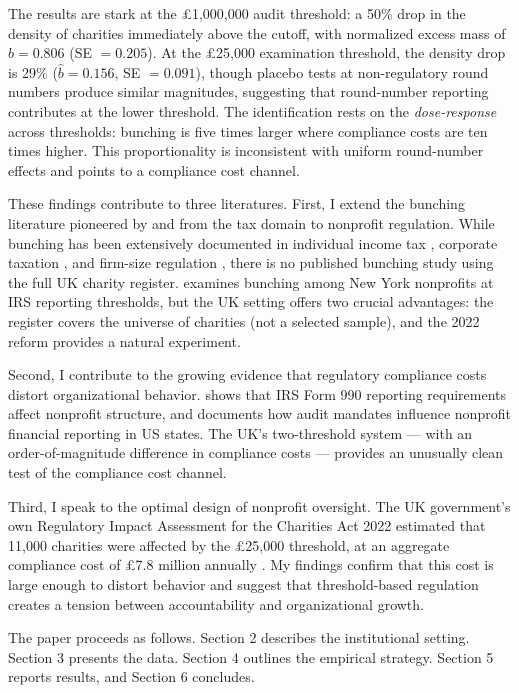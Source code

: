 \documentclass[12pt]{article}
\begin{document}
The results are stark at the \pounds1,000,000 audit threshold: a 50\% drop in the density of charities immediately above the cutoff, with normalized excess mass of $\hat{b} = 0.806$ (SE $= 0.205$). At the \pounds25,000 examination threshold, the density drop is 29\% ($\hat{b} = 0.156$, SE $= 0.091$), though placebo tests at non-regulatory round numbers produce similar magnitudes, suggesting that round-number reporting contributes at the lower threshold. The identification rests on the \emph{dose-response} across thresholds: bunching is five times larger where compliance costs are ten times higher. This proportionality is inconsistent with uniform round-number effects and points to a compliance cost channel.

These findings contribute to three literatures. First, I extend the bunching literature pioneered by \citet{saez2010} and \citet{klevenWaseem2013} from the tax domain to nonprofit regulation. While bunching has been extensively documented in individual income tax \citep{chetty2011adjustment}, corporate taxation \citep{deMontolivet2023}, and firm-size regulation \citep{garicano2016}, there is no published bunching study using the full UK charity register. \citet{yildirim2018} examines bunching among New York nonprofits at IRS reporting thresholds, but the UK setting offers two crucial advantages: the register covers the universe of charities (not a selected sample), and the 2022 reform provides a natural experiment.

Second, I contribute to the growing evidence that regulatory compliance costs distort organizational behavior. \citet{dharmapala2011} shows that IRS Form 990 reporting requirements affect nonprofit structure, and \citet{calabrese2021} documents how audit mandates influence nonprofit financial reporting in US states. The UK's two-threshold system --- with an order-of-magnitude difference in compliance costs --- provides an unusually clean test of the compliance cost channel.

Third, I speak to the optimal design of nonprofit oversight. The UK government's own Regulatory Impact Assessment for the Charities Act 2022 estimated that 11,000 charities were affected by the \pounds25,000 threshold, at an aggregate compliance cost of \pounds7.8 million annually \citep{dcms2022}. My findings confirm that this cost is large enough to distort behavior and suggest that threshold-based regulation creates a tension between accountability and organizational growth.

The paper proceeds as follows. Section 2 describes the institutional setting. Section 3 presents the data. Section 4 outlines the empirical strategy. Section 5 reports results, and Section 6 concludes.
\end{document}
